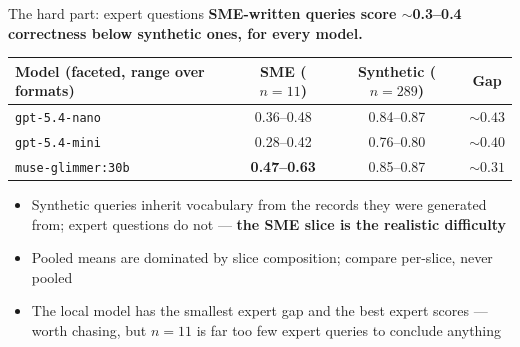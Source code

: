 \documentclass[aspectratio=169,10pt]{beamer}
\newcommand{\muted}[1]{\textcolor{inksec}{#1}}
\begin{document}
\begin{frame}{The hard part: expert questions}
  \textbf{SME-written queries score $\sim$0.3--0.4 correctness below synthetic ones, for every model.}
  \bigskip
  \begin{center}
  \renewcommand{\arraystretch}{1.4}
  \begin{tabular}{@{}lccc@{}}
    \toprule
    Model \muted{(faceted, range over formats)} & SME ($n{=}11$) & Synthetic ($n{=}289$) & Gap \\
    \midrule
    \texttt{gpt-5.4-nano} & 0.36--0.48 & 0.84--0.87 & ${\sim}0.43$ \\
    \texttt{gpt-5.4-mini} & 0.28--0.42 & 0.76--0.80 & ${\sim}0.40$ \\
    \texttt{muse-glimmer:30b} & \textbf{0.47--0.63} & 0.85--0.87 & ${\sim}0.31$ \\
    \bottomrule
  \end{tabular}
  \end{center}
  \bigskip
  \begin{itemize}
    \item Synthetic queries inherit vocabulary from the records they were generated from;
      expert questions do not --- \textbf{the SME slice is the realistic difficulty}
    \item Pooled means are dominated by slice composition; compare per-slice, never pooled
    \item The local model has the smallest expert gap and the best expert scores --- worth chasing,
      but $n{=}11$ is far too few expert queries to conclude anything
  \end{itemize}
\end{frame}
\end{document}
